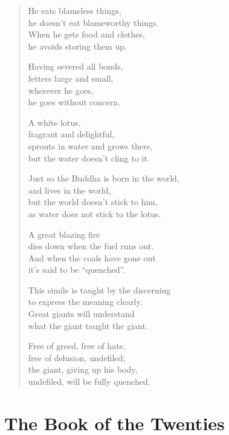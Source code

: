 \documentclass[12pt,openany]{book}%
\let\oldcontentsline\contentsline
\newcommand{\nopagecontentsline}[3]{\oldcontentsline{#1}{#2}{}}
\begin{document}
\begin{verse}
He eats blameless things, \\
he doesn’t eat blameworthy things. \\
When he gets food and clothes, \\
he avoids storing them up. 

Having severed all bonds, \\
fetters large and small, \\
wherever he goes, \\
he goes without concern. 

A white lotus, \\
fragrant and delightful, \\
sprouts in water and grows there, \\
but the water doesn’t cling to it. 

Just so the Buddha is born in the world, \\
and lives in the world, \\
but the world doesn’t stick to him, \\
as water does not stick to the lotus. 

A great blazing fire \\
dies down when the fuel runs out. \\
And when the coals have gone out \\
it’s said to be “quenched”. 

This simile is taught by the discerning \\
to express the meaning clearly. \\
Great giants will understand \\
what the giant taught the giant. 

Free of greed, free of hate, \\
free of delusion, undefiled; \\
the giant, giving up his body, \\
undefiled, will be fully quenched. 

%
\end{verse}

%
\part*{The Book of the Twenties }
\markboth{}{}
\addtocontents{toc}{\let\protect\contentsline\protect\oldcontentsline}
\end{document}
